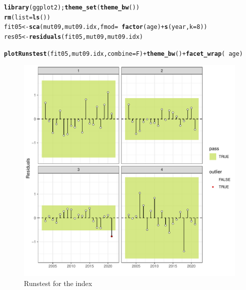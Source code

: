 \documentclass{article}\usepackage[]{graphicx}\usepackage[]{xcolor}
\makeatletter
\def\maxwidth{ %
  \ifdim\Gin@nat@width>\linewidth
    \linewidth
  \else
    \Gin@nat@width
  \fi
}
\newcommand{\hlnum}[1]{\textcolor[rgb]{0.686,0.059,0.569}{#1}}%
\newcommand{\hlopt}[1]{\textcolor[rgb]{0,0,0}{#1}}%
\newcommand{\hldef}[1]{\textcolor[rgb]{0.345,0.345,0.345}{#1}}%
\newcommand{\hlkwb}[1]{\textcolor[rgb]{0.69,0.353,0.396}{#1}}%
\newcommand{\hlkwc}[1]{\textcolor[rgb]{0.333,0.667,0.333}{#1}}%
\newcommand{\hlkwd}[1]{\textcolor[rgb]{0.737,0.353,0.396}{\textbf{#1}}}%
\newenvironment{kframe}{%
 \def\at@end@of@kframe{}%
 \ifinner\ifhmode%
  \def\at@end@of@kframe{\end{minipage}}%
  \begin{minipage}{\columnwidth}%
 \fi\fi%
 \def\FrameCommand##1{\hskip\@totalleftmargin \hskip-\fboxsep
 \colorbox{shadecolor}{##1}\hskip-\fboxsep
     \hskip-\linewidth \hskip-\@totalleftmargin \hskip\columnwidth}%
 \MakeFramed {\advance\hsize-\width
   \@totalleftmargin\z@ \linewidth\hsize
   \@setminipage}}%
 {\par\unskip\endMakeFramed%
 \at@end@of@kframe}
\newenvironment{knitrout}{}{} %
\makeatother
\begin{document}
\begin{knitrout}
\begin{kframe}
{\ttfamily\noindent\itshape\color{messagecolor}{\#\# Loading required package: ggplotFL}}\begin{alltt}
\hlkwd{library}\hldef{(ggplot2);}\hlkwd{theme_set}\hldef{(}\hlkwd{theme_bw}\hldef{())}
\hlkwd{rm}\hldef{(}\hlkwc{list} \hldef{=} \hlkwd{ls}\hldef{())}
\hldef{fit05} \hlkwb{<-} \hlkwd{sca}\hldef{(mut09, mut09.idx,} \hlkwc{fmod} \hldef{=} \hlopt{~}\hlkwd{factor}\hldef{(age)} \hlopt{+} \hlkwd{s}\hldef{(year,} \hlkwc{k} \hldef{=} \hlnum{8}\hldef{))}
\hldef{res05} \hlkwb{<-} \hlkwd{residuals}\hldef{(fit05, mut09, mut09.idx)}
\end{alltt}
\end{kframe}
\end{knitrout}

\begin{knitrout}
\color{fgcolor}\begin{kframe}
\begin{alltt}
\hlkwd{plotRunstest}\hldef{(fit05, mut09.idx,} \hlkwc{combine} \hldef{= F)} \hlopt{+} \hlkwd{theme_bw}\hldef{()} \hlopt{+} \hlkwd{facet_wrap}\hldef{(}\hlopt{~}\hldef{age)}
\end{alltt}
\end{kframe}\begin{figure}
\includegraphics[width=\maxwidth]{figure/idxrunstest-1} \caption[Runstest for the index]{Runstest for the index}\label{fig:idxrunstest}
\end{figure}

\end{knitrout}
\end{document}
